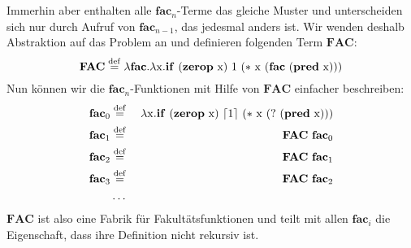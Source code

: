 Immerhin aber enthalten alle $\mathbf{fac}_n$-Terme das
gleiche Muster und unterscheiden sich nur durch Aufruf von
$\mathbf{fac}_{n-1}$, das jedesmal anders ist.  Wir wenden deshalb Abstraktion
auf das Problem an und definieren folgenden Term $\mathbf{FAC}$:
%
\begin{displaymath}
  \mathbf{FAC} \stackrel{\rm def}{=}{} \lambda\mathbf{fac}.\lambda \mathrm x.\mathbf{if}~(\mathbf{zerop}~\mathrm x)~1~(\ast~\mathrm x~(\mathbf{fac}~(\mathbf{pred}~\mathrm x)))
\end{displaymath}
%
Nun können wir die
$\mathbf{fac}_n$-Funktionen mit Hilfe von $\mathbf{FAC}$ einfacher beschreiben:
%
\begin{eqnarray*}
   \mathbf{fac}_0 &\stackrel{\rm def}{=}{}& \lambda \mathrm x.\mathbf{if}~(\mathbf{zerop}~\mathrm x)~\lceil 1\rceil~(\ast~\mathrm x~(?~(\mathbf{pred}~\mathrm x)))\\
   \mathbf{fac}_1 &\stackrel{\rm def}{=}{}& \mathbf{FAC}~\mathbf{fac}_0\\
   \mathbf{fac}_2 &\stackrel{\rm def}{=}{}& \mathbf{FAC}~\mathbf{fac}_1\\
   \mathbf{fac}_3 &\stackrel{\rm def}{=}{}& \mathbf{FAC}~\mathbf{fac}_2\\
   &\ldots&
\end{eqnarray*}
%
$\mathbf{FAC}$ ist also eine Fabrik für Fakultätsfunktionen und
teilt mit allen $\mathbf{fac}_i$ die Eigenschaft, dass ihre
Definition nicht rekursiv ist.

